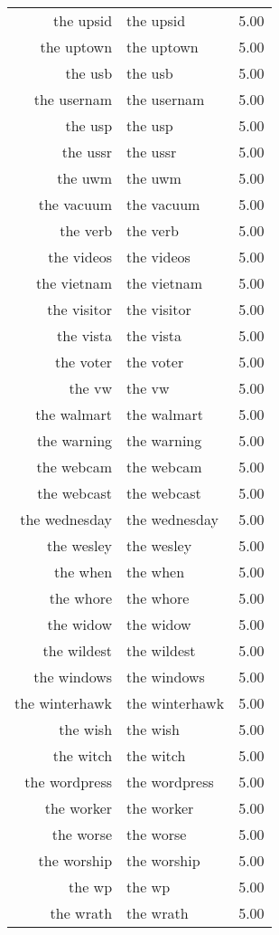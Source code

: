 \begin{table}[ht]
\begin{tabular}{rlr}
  the upsid & the upsid & 5.00 \\ 
  the uptown & the uptown & 5.00 \\ 
  the usb & the usb & 5.00 \\ 
  the usernam & the usernam & 5.00 \\ 
  the usp & the usp & 5.00 \\ 
  the ussr & the ussr & 5.00 \\ 
  the uwm & the uwm & 5.00 \\ 
  the vacuum & the vacuum & 5.00 \\ 
  the verb & the verb & 5.00 \\ 
  the videos & the videos & 5.00 \\ 
  the vietnam & the vietnam & 5.00 \\ 
  the visitor & the visitor & 5.00 \\ 
  the vista & the vista & 5.00 \\ 
  the voter & the voter & 5.00 \\ 
  the vw & the vw & 5.00 \\ 
  the walmart & the walmart & 5.00 \\ 
  the warning & the warning & 5.00 \\ 
  the webcam & the webcam & 5.00 \\ 
  the webcast & the webcast & 5.00 \\ 
  the wednesday & the wednesday & 5.00 \\ 
  the wesley & the wesley & 5.00 \\ 
  the when & the when & 5.00 \\ 
  the whore & the whore & 5.00 \\ 
  the widow & the widow & 5.00 \\ 
  the wildest & the wildest & 5.00 \\ 
  the windows & the windows & 5.00 \\ 
  the winterhawk & the winterhawk & 5.00 \\ 
  the wish & the wish & 5.00 \\ 
  the witch & the witch & 5.00 \\ 
  the wordpress & the wordpress & 5.00 \\ 
  the worker & the worker & 5.00 \\ 
  the worse & the worse & 5.00 \\ 
  the worship & the worship & 5.00 \\ 
  the wp & the wp & 5.00 \\ 
  the wrath & the wrath & 5.00 \\ 

\end{tabular}
\end{table}
